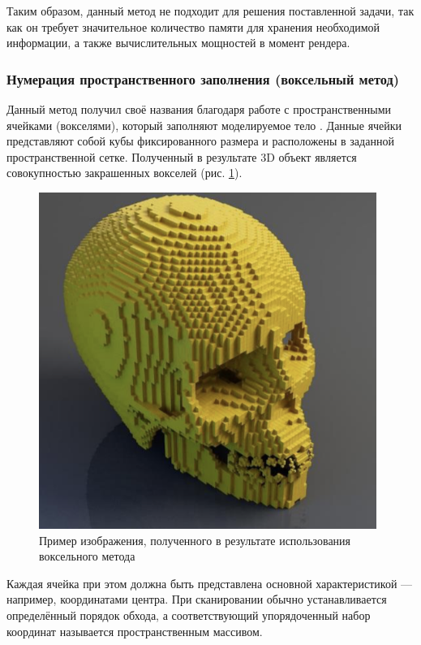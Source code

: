 Таким образом, данный метод не подходит для решения поставленной 
задачи, так как он требует значительное количество памяти для хранения 
необходимой информации, а также вычислительных мощностей в момент 
рендера.

\subsubsection{Нумерация пространственного заполнения (воксельный метод)} \label{sec:numeric}

Данный метод получил своё названия благодаря работе с 
пространственными ячейками (вокселями), который заполняют моделируемое 
тело \cite{numeric-octree}.
Данные ячейки представляют собой кубы фиксированного размера и 
расположены в заданной пространственной сетке.
Полученный в результате 3D 
объект является совокупностью закрашенных вокселей (рис. \ref{fig:numeric}). 

\begin{figure}[h]
	\centering
	\captionsetup{justification=centering}
	\includegraphics[width=110mm]{img/numeric.png}
	\caption{Пример изображения, полученного в результате 
		использования воксельного метода}
	\label{fig:numeric}
\end{figure}

Каждая ячейка при этом должна быть представлена основной 
характеристикой --- например, координатами центра.
При сканировании 
обычно устанавливается определённый порядок обхода, а соответствующий 
упорядоченный набор координат называется пространственным массивом.

